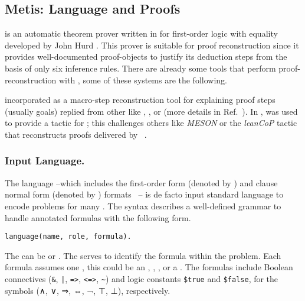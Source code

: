 \documentclass[../main.tex]{subfiles}
\begin{document}

\subsection{Metis: Language and Proofs}
\label{ssec:metis-language-and-proofs}

\Metis is an automatic theorem prover written in 
for first-order logic with equality developed by John Hurd
\cite{hurd2003first}. This prover is suitable for proof
reconstruction since it provides well-documented proof-objects to
justify its deduction steps from the basis of only six inference
rules. There are already some tools that perform proof-reconstruction
with \Metis, some of these systems are the following.

 incorporated \Metis as a macro-step
reconstruction tool for explaining proof steps (usually \CNF goals)
replied from other \ATPs like , , or
 (more details in Ref.~\cite{paulson2007source}).
In \cite{Farber2015}, \Metis was used to provide a tactic for
; this challenges others like \emph{MESON}
or the \emph{leanCoP} tactic that reconstructs proofs
delivered by ~\cite{Farber2016}.


\subsubsection{Input Language.}
\label{ssec:input-language}

The \TPTP language --which includes the first-order
form (denoted by ) and clause normal form (denoted by
) formats~\cite{sutcliffe2009} -- is de facto input
standard language to encode problems for many \ATPs. The \TPTP
syntax describes a well-defined grammar to handle annotated formulas
with the following form.

\begin{verbatim}
language(name, role, formula).
\end{verbatim}

The  can be  or . The 
serves to identify the formula within the problem. Each formula
assumes one , this could be an ,
, , or a .
The formulas include Boolean connectives (\verb!&!, \verb!|!,
\verb!=>!, \verb!<=>!, \verb!~!) and logic constants \verb!$true!
and \verb!$false!, for the symbols (∧, ∨, ⇒, ⇔, ¬, ⊤, ⊥), respectively.
\end{document}
